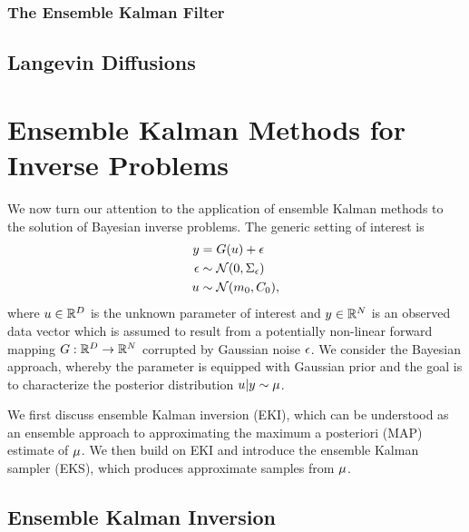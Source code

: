 \documentclass[12pt]{article}
\begin{document}
\subsubsection{The Ensemble Kalman Filter}


\subsection{Langevin Diffusions}

\section{Ensemble Kalman Methods for Inverse Problems}
We now turn our attention to the application of ensemble Kalman methods to the solution of Bayesian inverse problems. 
The generic setting of interest is 
\begin{align}
y &= G(u) + \epsilon \label{inverse_problem} \\
\epsilon &\sim \mathcal{N}(0, \Sigma_{\epsilon}) \nonumber \\
u &\sim \mathcal{N}(m_0, C_0), \nonumber
\end{align}
where $u \in \mathbb{R}^{D}$ is the unknown parameter of interest and $y \in \mathbb{R}^{N}$ is an observed 
data vector which is assumed to result from a potentially non-linear forward mapping $G: \mathbb{R}^{D} \to \mathbb{R}^{N}$
corrupted by Gaussian noise $\epsilon$. We consider the Bayesian approach, whereby the parameter is equipped with 
Gaussian prior and the goal is to characterize the posterior distribution $u|y \sim \mu$. 

We first discuss ensemble Kalman inversion (EKI), which can be understood as an ensemble approach to approximating the 
maximum a posteriori (MAP) estimate of $\mu$. We then build on EKI and introduce the ensemble Kalman sampler (EKS), 
which produces approximate samples from $\mu$.  

\subsection{Ensemble Kalman Inversion}
\end{document}
